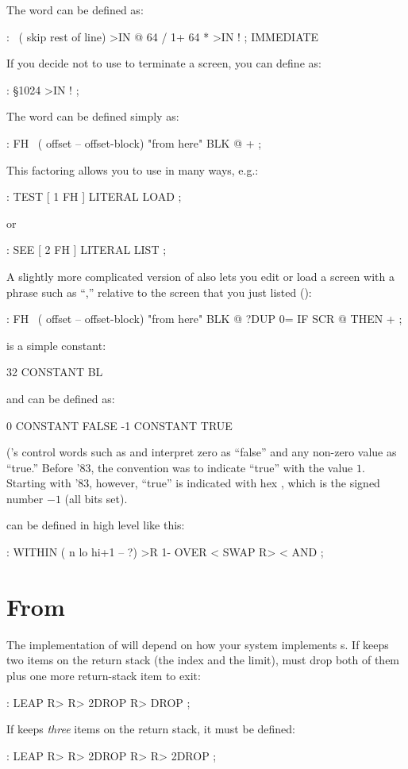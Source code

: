 The word \forthb{\bs} can be defined as:
\begin{Code}
: \  ( skip rest of line)
     >IN @  64 / 1+  64 *  >IN ! ; IMMEDIATE
\end{Code}
If you decide not to use  to terminate a screen, you can
define  as:
\begin{Code}
: \S   1024 >IN ! ;
\end{Code}
%
The word  can be defined simply as:
\begin{Code}
: FH   \   ( offset -- offset-block)   "from here"
    BLK @ + ;
\end{Code}
This factoring allows you to use  in many ways, e.g.:
\begin{Code}
: TEST   [ 1 FH ] LITERAL LOAD ;
\end{Code}
or
\begin{Code}
: SEE   [ 2 FH ] LITERAL LIST ;
\end{Code}
A slightly more complicated version of  also lets you edit or
load a screen with a phrase such as ``,'' relative to
the screen that you just listed ():
\begin{Code}
: FH   \   ( offset -- offset-block)   "from here"
     BLK @  ?DUP 0= IF  SCR @  THEN  + ;
\end{Code}
 is a simple constant:
\begin{Code}
32 CONSTANT BL
\end{Code}
 and 
can be defined as:
\begin{Code}
0 CONSTANT FALSE
-1 CONSTANT TRUE
\end{Code}
(\Forth{}'s control words such as  and  interpret
zero as ``false'' and any non-zero value as ``true.''  Before \Forth{}
'83, the convention was to indicate ``true'' with the value $1$.  Starting
with \Forth{} '83, however, ``true'' is indicated with hex ,
which is the signed number $-1$ (all bits set).

 can be defined in high level like this:
\begin{Code}
: WITHIN  ( n lo hi+1 -- ?)
     >R  1- OVER <  SWAP R>  < AND ;
\end{Code}

\section{From }

The implementation of  will depend on how your
system implements  s.  If  keeps two
items on the return stack (the index and the limit),  must
drop both of them plus one more return-stack item to exit:
\begin{Code}
: LEAP   R> R> 2DROP  R> DROP ;
\end{Code}
If  keeps \emph{three} items on the return stack, it must be
defined:
\begin{Code}
: LEAP   R> R> 2DROP  R> R> 2DROP ;
\end{Code}

